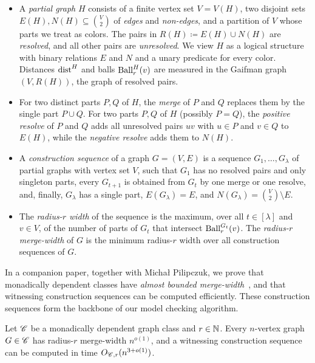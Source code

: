 \begin{itemize}%
    \item A \emph{partial graph} $H$ consists of a finite vertex set $V=V(H)$, two disjoint sets $E(H),N(H)\subseteq\binom V2$ of \emph{edges} and \emph{non-edges}, and a partition of $V$ whose parts we treat as colors.
    The pairs in $R(H)\coloneqq E(H)\cup N(H)$ are \emph{resolved}, and all other pairs are \emph{unresolved}.
    We view $H$ as a logical structure with binary relations $E$ and $N$ and a unary predicate for every color.
    Distances $\mathrm{dist}^H$ and balls $\operatorname{Ball}^H_r(v)$ are measured in the Gaifman graph $(V,R(H))$, the graph of resolved pairs.
    \item For two distinct parts $P,Q$ of $H$, the \emph{merge} of $P$ and $Q$ replaces them by the single part $P\cup Q$.
    For two parts $P,Q$ of $H$ (possibly $P=Q$), the \emph{positive resolve} of $P$ and $Q$ adds all unresolved pairs $uv$ with $u\in P$ and $v\in Q$ to $E(H)$, while the \emph{negative resolve} adds them to $N(H)$.
    \item A \emph{construction sequence} of a graph $G=(V,E)$ is a sequence $G_1,\ldots,G_\lambda$ of partial graphs with vertex set $V$,
    such that $G_1$ has no resolved pairs and only singleton parts, every $G_{t+1}$ is obtained from $G_t$ by one merge or one resolve,
    and, finally, $G_\lambda$ has a single part, $E(G_\lambda)=E$, and $N(G_\lambda)=\binom V2\setminus E$.
    \item The \emph{radius-$r$ width} of the sequence is the maximum, over all $t\in[\lambda]$ and $v\in V$, of the number of parts of $G_t$ that intersect $\operatorname{Ball}^{G_t}_r(v)$.
    The \emph{radius-$r$ merge-width} of $G$ is the minimum radius-$r$ width over all construction sequences of $G$.
\end{itemize}

In a companion paper, together with Micha\l{} Pilipczuk, we prove that monadically dependent classes have \emph{almost bounded merge-width}~\cite{md-abmw}, and that witnessing construction sequences can be computed efficiently.
These construction sequences form the backbone of our model checking algorithm.

\begin{theorem}\label{thm:ov-abmw}
  Let $\mathscr C$ be a monadically dependent graph class and $r\in\mathbb N$.
  Every $n$-vertex graph $G\in\mathscr C$ has radius-$r$ merge-width $n^{o(1)}$, and a witnessing construction sequence can be computed in time $O_{\mathscr C,r}(n^{3+o(1)})$.
\end{theorem}

